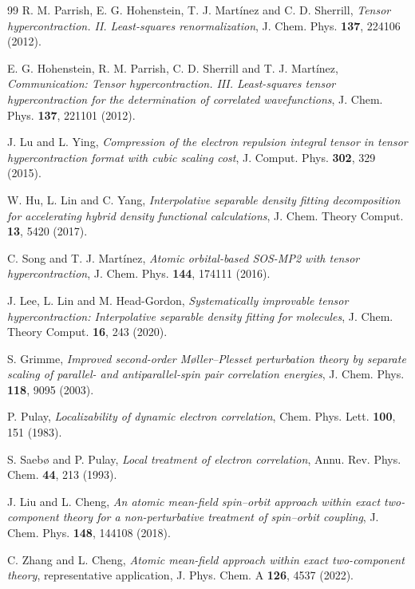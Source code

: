 \documentclass[aip,jcp,amsmath,amssymb,preprint,superscriptaddress]{revtex4-2}%
\begin{document}
\begin{thebibliography}{99}
 R. M. Parrish, E. G. Hohenstein, T. J. Mart{\'i}nez and
  C. D. Sherrill,
  \emph{Tensor hypercontraction. II. Least-squares renormalization},
  J. Chem. Phys. \textbf{137}, 224106 (2012).

 E. G. Hohenstein, R. M. Parrish, C. D. Sherrill and
  T. J. Mart{\'i}nez,
  \emph{Communication: Tensor hypercontraction. III. Least-squares tensor
  hypercontraction for the determination of correlated wavefunctions},
  J. Chem. Phys. \textbf{137}, 221101 (2012).

 J. Lu and L. Ying,
  \emph{Compression of the electron repulsion integral tensor in tensor
  hypercontraction format with cubic scaling cost},
  J. Comput. Phys. \textbf{302}, 329 (2015).

 W. Hu, L. Lin and C. Yang,
  \emph{Interpolative separable density fitting decomposition for accelerating
  hybrid density functional calculations},
  J. Chem. Theory Comput. \textbf{13}, 5420 (2017).

 C. Song and T. J. Mart{\'i}nez,
  \emph{Atomic orbital-based SOS-MP2 with tensor hypercontraction},
  J. Chem. Phys. \textbf{144}, 174111 (2016).

 J. Lee, L. Lin and M. Head-Gordon,
  \emph{Systematically improvable tensor hypercontraction: Interpolative
  separable density fitting for molecules},
  J. Chem. Theory Comput. \textbf{16}, 243 (2020).

 S. Grimme,
  \emph{Improved second-order M{\o}ller--Plesset perturbation theory by
  separate scaling of parallel- and antiparallel-spin pair correlation
  energies}, J. Chem. Phys. \textbf{118}, 9095 (2003).

 P. Pulay,
  \emph{Localizability of dynamic electron correlation},
  Chem. Phys. Lett. \textbf{100}, 151 (1983).

 S. Saeb{\o} and P. Pulay,
  \emph{Local treatment of electron correlation},
  Annu. Rev. Phys. Chem. \textbf{44}, 213 (1993).

 J. Liu and L. Cheng,
  \emph{An atomic mean-field spin--orbit approach within exact two-component
  theory for a non-perturbative treatment of spin--orbit coupling},
  J. Chem. Phys. \textbf{148}, 144108 (2018).

 C. Zhang and L. Cheng,
  \emph{Atomic mean-field approach within exact two-component theory},
  representative application, J. Phys. Chem. A \textbf{126}, 4537 (2022).

\end{thebibliography}
\end{document}
